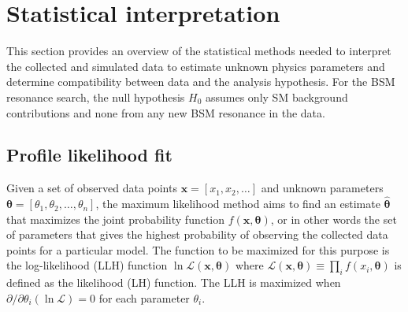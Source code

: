 \documentclass[../thesis.tex]{subfiles}
\begin{document}
\vspace{-1\baselineskip}
\section{Statistical interpretation}
\label{sec:stat}
This section provides an overview of the statistical methods needed to interpret the collected and simulated data to estimate unknown physics parameters and determine compatibility between data and the analysis hypothesis. For the \acs{BSM} resonance search, the null hypothesis $H_0$ assumes only \acs{SM} background contributions and none from any new \acs{BSM} resonance in the data.


\subsection{Profile likelihood fit}
Given a set of observed data points $\mathbf{x}=\left[x_1,x_2,\dots\right]$ and unknown parameters $\bm{\theta}=\left[\theta_1,\theta_2,\dots,\theta_n\right]$, the maximum likelihood method aims to find an estimate $\hat{\bm{\theta}}$ that maximizes the joint probability function $f(\mathbf{x},\bm{\theta})$, or in other words the set of parameters that gives the highest probability of observing the collected data points for a particular model. The function to be maximized for this purpose is the log-likelihood (\acs{LLH}) function $\ln \mathcal{L}(\mathbf{x},\bm{\theta})$ where $\mathcal{L}(\mathbf{x},\bm{\theta}) \equiv \prod_i f(x_i,\bm{\theta})$ is defined as the likelihood (\acs{LH}) function. The \acs{LLH} is maximized when $\partial/\partial\theta_i \left(\ln\mathcal{L}\right)=0$ for each parameter $\theta_i$.
\end{document}
